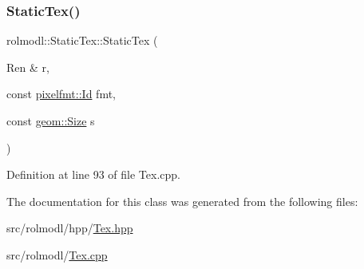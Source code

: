 \subsubsection{\texorpdfstring{StaticTex()}{StaticTex()}}
{\footnotesize\ttfamily rolmodl\+::\+Static\+Tex\+::\+Static\+Tex (\begin{DoxyParamCaption}\item[{Ren \&}]{r,  }\item[{const \mbox{\hyperlink{namespacerolmodl_1_1pixelfmt_a96282713e4465ba9211c8fd3a702b52b}{pixelfmt\+::\+Id}}}]{fmt,  }\item[{const \mbox{\hyperlink{structrolmodl_1_1geom_1_1_size}{geom\+::\+Size}}}]{s }\end{DoxyParamCaption})}



Definition at line 93 of file Tex.\+cpp.



The documentation for this class was generated from the following files\+:\begin{DoxyCompactItemize}
\item 
src/rolmodl/hpp/\mbox{\hyperlink{_tex_8hpp}{Tex.\+hpp}}\item 
src/rolmodl/\mbox{\hyperlink{_tex_8cpp}{Tex.\+cpp}}\end{DoxyCompactItemize}
